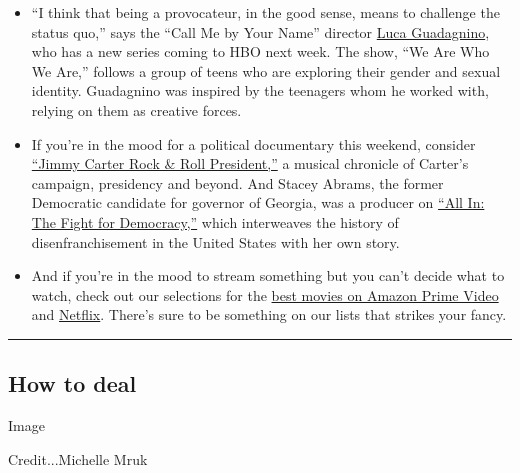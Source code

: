 \begin{itemize}
\item
  ``I think that being a provocateur, in the good sense, means to
  challenge the status quo,'' says the ``Call Me by Your Name'' director
  \href{https://www.nytimes3xbfgragh.onion/2020/09/10/arts/television/luca-guadagnino.html}{Luca
  Guadagnino}, who has a new series coming to HBO next week. The show,
  ``We Are Who We Are,'' follows a group of teens who are exploring
  their gender and sexual identity. Guadagnino was inspired by the
  teenagers whom he worked with, relying on them as creative forces.
\item
  If you're in the mood for a political documentary this weekend,
  consider
  \href{https://www.nytimes3xbfgragh.onion/2020/09/10/movies/jimmy-carter-rock-roll-president-review.html}{``Jimmy
  Carter Rock \& Roll President,''} a musical chronicle of Carter's
  campaign, presidency and beyond. And Stacey Abrams, the former
  Democratic candidate for governor of Georgia, was a producer on
  \href{https://www.nytimes3xbfgragh.onion/2020/09/09/movies/all-in-the-fight-for-democracy-review.html}{``All
  In: The Fight for Democracy,''} which interweaves the history of
  disenfranchisement in the United States with her own story.
\item
  And if you're in the mood to stream something but you can't decide
  what to watch, check out our selections for the
  \href{https://www.nytimes3xbfgragh.onion/2020/09/10/arts/the-best-movies-on-amazon-prime-video-right-now.html}{best
  movies on Amazon Prime Video} and
  \href{https://www.nytimes3xbfgragh.onion/2020/09/10/movies/the-50-best-movies-on-netflix-right-now.html}{Netflix}.
  There's sure to be something on our lists that strikes your fancy.
\end{itemize}

\begin{center}\rule{0.5\linewidth}{\linethickness}\end{center}

\hypertarget{how-to-deal}{%
\subsection{How to deal}\label{how-to-deal}}

Image

Credit...Michelle Mruk

